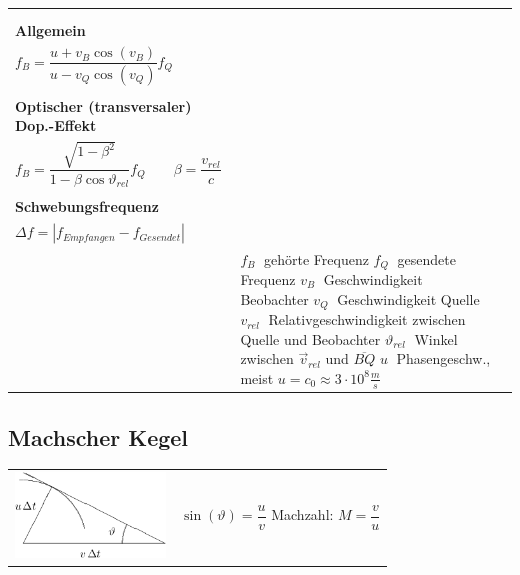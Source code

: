 \begin{tabular}{|l|l|l|}
\begin{minipage}[]{7cm}
	  	$f_B = \left(1 + \dfrac{v_B}{u} \cos(\vartheta_B)\right) f_Q$ \\
	  	\vspace{.5cm}\\
	  	\textbf{Allgemein} \\
	  	$f_B = \dfrac{u + v_B \cos(v_B)}{u - v_Q \cos(v_Q)} f_Q$ \\
	  	\vspace{.5cm}\\
	  	\textbf{Optischer (transversaler) Dop.-Effekt } \\
	  	$f_B = \dfrac{\sqrt{1 - \beta^2}}{1 - \beta \cos \vartheta_{rel}} f_Q \qquad \beta =
	  	\dfrac{v_{rel}}{c}$ \\ \vspace{.5cm}\\
	  	\textbf{Schwebungsfrequenz}\\
	  	$\Delta f = |f_{Empfangen} - f_{Gesendet}|$ \\ \vspace{.2cm}
      	\renewcommand{\arraystretch}{1}
    	\end{minipage}
	& \parbox{6.5cm}{
		$f_B \;$ gehörte Frequenz \\
		$f_Q \;$ gesendete Frequenz \\
		$v_B \;$ Geschwindigkeit Beobachter \\
		$v_Q \;$ Geschwindigkeit Quelle\\
		$v_{rel} \;$ Relativgeschwindigkeit zwischen Quelle und Beobachter\\
		$\vartheta_{rel} \;$ Winkel zwischen $\vec{v}_{rel}$ und $\overline{BQ}$\\
		$u \;$ Phasengeschw., meist $u = c_0 \approx 3 \cdot 10^8 \frac{m}{s}$
		} \\
\hline
\end{tabular}

\subsection{Machscher Kegel  }
\begin{tabular}{ll}
\parbox{5cm}{
	\includegraphics[width=4cm]{./bilder/machscher-kegel.png}}
	& $\sin(\vartheta)=\dfrac{u}{v}$ \qquad \qquad Machzahl: $M=\dfrac{v}{u}$
\end{tabular}


